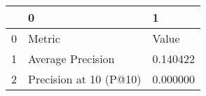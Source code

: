 \begin{tabular}{lll}
\toprule
 & 0 & 1 \\
\midrule
0 & Metric & Value \\
1 & Average Precision & 0.140422 \\
2 & Precision at 10 (P@10) & 0.000000 \\
\bottomrule
\end{tabular}

